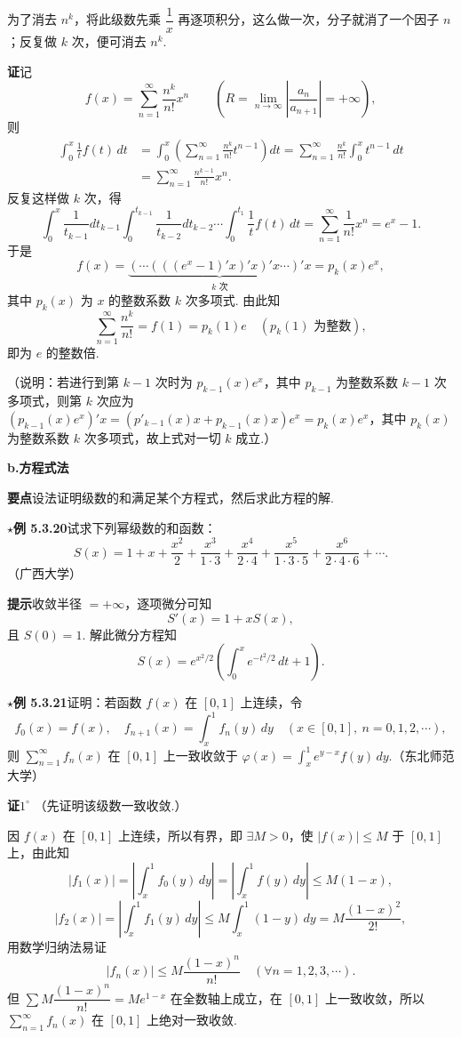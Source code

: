 \documentclass[UTF8, 12pt, fontset=fandol, oneside]{ctexart}
\begin{document}
为了消去 $n^k$，将此级数先乘 $\dfrac1x$ 再逐项积分，这么做一次，分子就消了一个因子 $n$；反复做 $k$ 次，便可消去 $n^k$.

\noindent\textbf{证}\quad 记
\[
  f(x)=\sum_{n=1}^{\infty}\frac{n^k}{n!}x^n
  \qquad\left(R=\lim_{n\to\infty}\left|\frac{a_n}{a_{n+1}}\right|=+\infty\right),
\]
则
\[
\begin{aligned}
\int_0^x\frac1t f(t)\,dt
&=\int_0^x\left(\sum_{n=1}^{\infty}\frac{n^k}{n!}t^{n-1}\right)dt
=\sum_{n=1}^{\infty}\frac{n^k}{n!}\int_0^x t^{n-1}\,dt\\
&=\sum_{n=1}^{\infty}\frac{n^{k-1}}{n!}x^n.
\end{aligned}
\]
反复这样做 $k$ 次，得
\[
  \int_0^x\frac1{t_{k-1}}dt_{k-1}\int_0^{t_{k-1}}\frac1{t_{k-2}}dt_{k-2}
  \cdots\int_0^{t_1}\frac1t f(t)\,dt
  =\sum_{n=1}^{\infty}\frac1{n!}x^n=e^x-1.
\]
于是
\[
  f(x)=\underbrace{(\cdots(((e^x-1)'x)'x)'x\cdots)'x}_{k\text{ 次}}=p_k(x)e^x,
\]
其中 $p_k(x)$ 为 $x$ 的整数系数 $k$ 次多项式. 由此知
\[
  \sum_{n=1}^{\infty}\frac{n^k}{n!}=f(1)=p_k(1)e\quad(p_k(1)\text{ 为整数}),
\]
即为 $e$ 的整数倍.

（说明：若进行到第 $k-1$ 次时为 $p_{k-1}(x)e^x$，其中 $p_{k-1}$ 为整数系数 $k-1$ 次多项式，则第 $k$ 次应为
$(p_{k-1}(x)e^x)'x=(p'_{k-1}(x)x+p_{k-1}(x)x)e^x=p_k(x)e^x$，其中 $p_k(x)$ 为整数系数 $k$ 次多项式，故上式对一切 $k$ 成立.）

\noindent\textbf{b.\quad 方程式法}

\noindent\textbf{要点}\quad 设法证明级数的和满足某个方程式，然后求此方程的解.

\noindent\(\star\)\textbf{例 5.3.20}\quad 试求下列幂级数的和函数：
\[
  S(x)=1+x+\frac{x^2}{2}+\frac{x^3}{1\cdot3}+\frac{x^4}{2\cdot4}
  +\frac{x^5}{1\cdot3\cdot5}+\frac{x^6}{2\cdot4\cdot6}+\cdots.
\]
（广西大学）

\noindent\textbf{提示}\quad 收敛半径 $=+\infty$，逐项微分可知
\[
  S'(x)=1+xS(x),
\]
且 $S(0)=1$. 解此微分方程知
\[
  S(x)=e^{x^2/2}\left(\int_0^x e^{-t^2/2}\,dt+1\right).
\]

\noindent\(\star\)\textbf{例 5.3.21}\quad 证明：若函数 $f(x)$ 在 $[0,1]$ 上连续，令
\[
  f_0(x)=f(x),\quad f_{n+1}(x)=\int_x^1 f_n(y)\,dy
  \quad(x\in[0,1],\ n=0,1,2,\cdots),
\]
则 $\displaystyle\sum_{n=1}^{\infty}f_n(x)$ 在 $[0,1]$ 上一致收敛于
$\varphi(x)=\displaystyle\int_x^1 e^{y-x}f(y)\,dy$.（东北师范大学）

\noindent\textbf{证}\quad $1^\circ$ （先证明该级数一致收敛.）

因 $f(x)$ 在 $[0,1]$ 上连续，所以有界，即 $\exists M>0$，使 $|f(x)|\le M$ 于 $[0,1]$ 上，由此知
\[
  |f_1(x)|=\left|\int_x^1 f_0(y)\,dy\right|
  =\left|\int_x^1 f(y)\,dy\right|\le M(1-x),
\]
\[
  |f_2(x)|=\left|\int_x^1 f_1(y)\,dy\right|
  \le M\int_x^1(1-y)\,dy=M\frac{(1-x)^2}{2!},
\]
用数学归纳法易证
\[
  |f_n(x)|\le M\frac{(1-x)^n}{n!}\quad(\forall n=1,2,3,\cdots).
\]
但 $\displaystyle\sum M\dfrac{(1-x)^n}{n!}=Me^{1-x}$ 在全数轴上成立，在 $[0,1]$ 上一致收敛，所以
$\displaystyle\sum_{n=1}^{\infty}f_n(x)$ 在 $[0,1]$ 上绝对一致收敛.
\end{document}
